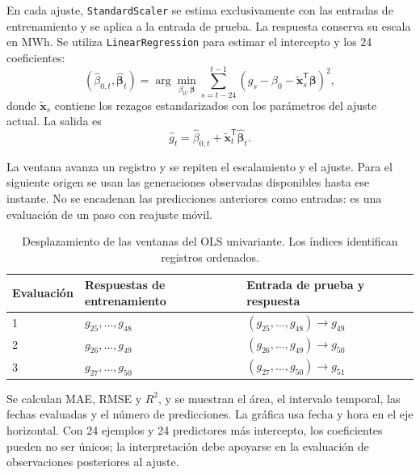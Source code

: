 En cada ajuste, \texttt{StandardScaler} se estima exclusivamente con las entradas de entrenamiento y se aplica a la entrada de prueba. La respuesta conserva su escala en MWh. Se utiliza \texttt{LinearRegression} para estimar el intercepto y los 24 coeficientes:
\begin{equation}
(\hat{\beta}_{0,t},\hat{\boldsymbol{\beta}}_t)
=\arg\min_{\beta_0,\boldsymbol{\beta}}
\sum_{s=t-24}^{t-1}
\left(g_s-\beta_0-\widetilde{\boldsymbol{x}}_s^{\mathsf T}
\boldsymbol{\beta}\right)^2,
\end{equation}
donde $\widetilde{\boldsymbol{x}}_s$ contiene los rezagos estandarizados con los parámetros del ajuste actual. La salida es
\begin{equation}
\hat g_t=\hat{\beta}_{0,t}
+\widetilde{\boldsymbol{x}}_t^{\mathsf T}\hat{\boldsymbol{\beta}}_t.
\end{equation}

La ventana avanza un registro y se repiten el escalamiento y el ajuste. Para el siguiente origen se usan las generaciones observadas disponibles hasta ese instante. No se encadenan las predicciones anteriores como entradas: es una evaluación de un paso con reajuste móvil.

\begin{table}[htbp]
\centering
\caption{Desplazamiento de las ventanas del OLS univariante. Los índices identifican registros ordenados.}
\label{tab:ventanas-ols}
\begin{tabular}{lll}
\toprule
Evaluación & Respuestas de entrenamiento & Entrada de prueba y respuesta \\
\midrule
1 & $g_{25},\ldots,g_{48}$ & $(g_{25},\ldots,g_{48})\to g_{49}$ \\
2 & $g_{26},\ldots,g_{49}$ & $(g_{26},\ldots,g_{49})\to g_{50}$ \\
3 & $g_{27},\ldots,g_{50}$ & $(g_{27},\ldots,g_{50})\to g_{51}$ \\
\bottomrule
\end{tabular}
\end{table}

Se calculan MAE, RMSE y $R^2$, y se muestran el área, el intervalo temporal, las fechas evaluadas y el número de predicciones. La gráfica usa fecha y hora en el eje horizontal. Con 24 ejemplos y 24 predictores más intercepto, los coeficientes pueden no ser únicos; la interpretación debe apoyarse en la evaluación de observaciones posteriores al ajuste.
